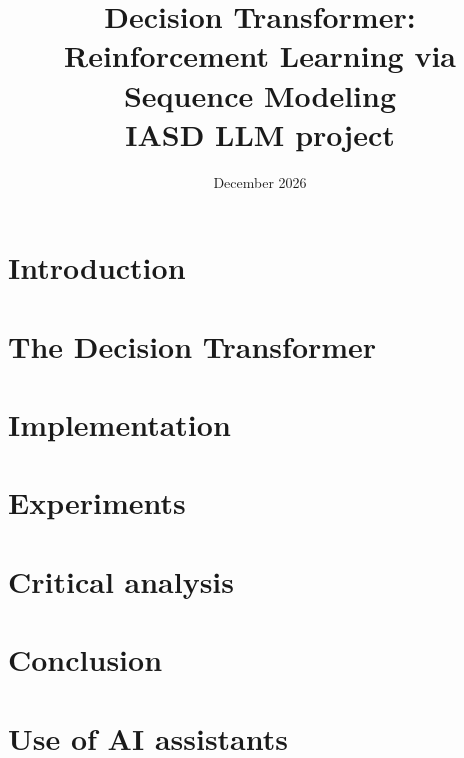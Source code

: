 \documentclass[11pt]{article}
\title{Decision Transformer: Reinforcement Learning via Sequence Modeling\\\large IASD LLM project}
\author{}
\date{December 2026}
\begin{document}
\maketitle

\section{Introduction}
\section{The Decision Transformer}
\section{Implementation}
\section{Experiments}
\section{Critical analysis}
\section{Conclusion}
\section*{Use of AI assistants}
\end{document}
